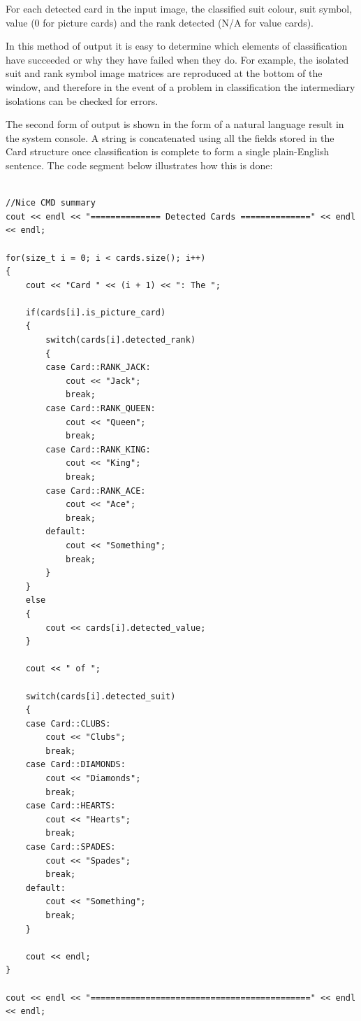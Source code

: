 \documentclass[a4paper,12pt,notitlepage]{article}
\begin{document}
		For each detected card in the input image, the classified suit colour, suit symbol, value (0 for picture cards) and the rank detected (N/A for value cards).
		
		In this method of output it is easy to determine which elements of classification have succeeded or why they have failed when they do. For example, the isolated suit and rank symbol image matrices are reproduced at the bottom of the window, and therefore in the event of a problem in classification the intermediary isolations can be checked for errors. 
		
		The second form of output is shown in the form of a natural language result in the system console. A string is concatenated using all the fields stored in the Card structure once classification is complete to form a single plain-English sentence. The code segment below illustrates how this is done:

		\begin{lstlisting}

//Nice CMD summary
cout << endl << "============== Detected Cards ==============" << endl << endl;

for(size_t i = 0; i < cards.size(); i++)
{
    cout << "Card " << (i + 1) << ": The ";

    if(cards[i].is_picture_card)
    {
        switch(cards[i].detected_rank)
        {
        case Card::RANK_JACK:
            cout << "Jack";
            break;
        case Card::RANK_QUEEN:
            cout << "Queen";
            break;
        case Card::RANK_KING:
            cout << "King";
            break;
        case Card::RANK_ACE:
            cout << "Ace";
            break;
        default:
            cout << "Something";
            break;
        }
    }
    else
    {
        cout << cards[i].detected_value;
    }

    cout << " of ";

    switch(cards[i].detected_suit)
    {
    case Card::CLUBS:
        cout << "Clubs";
        break;
    case Card::DIAMONDS:
        cout << "Diamonds";
        break;
    case Card::HEARTS:
        cout << "Hearts";
        break;
    case Card::SPADES:
        cout << "Spades";
        break;
    default:
        cout << "Something";
        break;
    }

    cout << endl;
}

cout << endl << "============================================" << endl << endl;
		\end{lstlisting}
\end{document}
